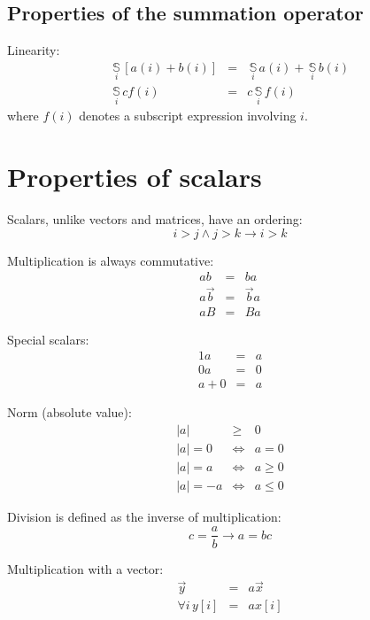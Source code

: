 \documentclass{article}
\newcommand{\summation}[1]{\underset{#1}{\,\mathbb{S}\,}}
\begin{document}
\subsection{Properties of the summation operator}

Linearity:
\begin{eqnarray}
	\summation{i} \left [ a(i) + b(i) \right ] & = & \summation{i} a(i) + \summation{i} b(i) \\
	\summation{i} c f(i) & = & c \summation{i} f(i)
\end{eqnarray}
where $f(i)$ denotes a subscript expression involving $i$.


\section{Properties of scalars}

Scalars, unlike vectors and matrices, have an ordering:
\begin{equation}
	i > j \land j > k \rightarrow i > k
\end{equation}

Multiplication is always commutative:
\begin{eqnarray}
	a b & = & b a \\
	a \vec b & = & \vec b a \\
	a B & = & B a
\end{eqnarray}

Special scalars:
\begin{eqnarray}
	1 a & = & a \\
	0 a & = & 0 \\
	a + 0 & = & a
\end{eqnarray}

Norm (absolute value):
\begin{eqnarray}
	| a | & \ge & 0 \\
	| a | = 0 & \iff & a=0 \\
	| a | = a & \iff & a \ge 0 \\
	| a | = -a & \iff & a \le 0
\end{eqnarray}

Division is defined as the inverse of multiplication:
\begin{equation}
	c = \frac{a}{b} \rightarrow a = b c
\end{equation}

Multiplication with a vector:
\begin{eqnarray}
	\vec y & = & a \vec x \\
	\forall i\, y[i] & = & a x[i]
\end{eqnarray}
\end{document}

